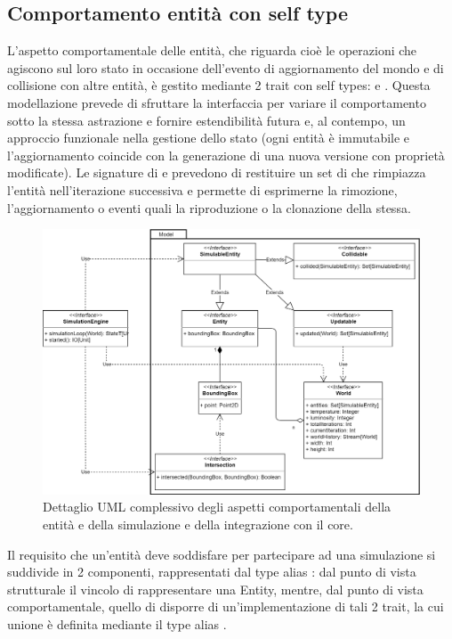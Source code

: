 \subsection{Comportamento entità con self type}
L’aspetto comportamentale delle entità, che riguarda cioè le operazioni che agiscono sul loro stato in occasione dell’evento di aggiornamento del mondo e di collisione con altre entità, è gestito mediante 2 trait con self types:  e . Questa modellazione prevede di sfruttare la interfaccia per variare il comportamento sotto la stessa astrazione e fornire estendibilità futura e, al contempo, un approccio funzionale nella gestione dello stato (ogni entità è immutabile e l’aggiornamento coincide con la generazione di una nuova versione con proprietà modificate). Le signature di  e  prevedono di restituire un set di  che rimpiazza l’entità nell’iterazione successiva e permette di esprimerne la rimozione, l’aggiornamento o eventi quali la riproduzione o la clonazione della stessa.

\begin{figure}[h!]
\centering
\includegraphics[width=\textwidth, scale=0.14]{img/Model.png}
\caption{Dettaglio UML complessivo degli aspetti comportamentali della entità e della simulazione e della integrazione con il core. }
\label{fig:model}
\end{figure}

Il requisito che un’entità deve soddisfare per partecipare ad una simulazione si suddivide in 2 componenti, rappresentati dal type alias : dal punto di vista strutturale il vincolo di rappresentare una Entity, mentre, dal punto di vista comportamentale, quello di disporre di un’implementazione di tali 2 trait, la cui unione è definita mediante il type alias .

